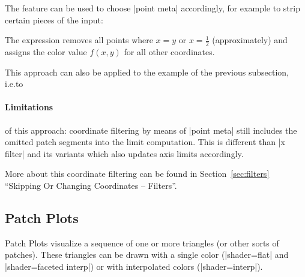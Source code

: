 {The feature can be used to choose |point meta| accordingly, for example to
strip certain pieces of the input:
%
\begin{codeexample}[]
\end{codeexample}

The expression removes all points where $x=y$ or $x=\frac12$ (approximately)
and assigns the color value $f(x,y)$ for all other coordinates.

This approach can also be applied to the example of the previous subsection,
i.e.\@ to
%
\begin{codeexample}[]
\end{codeexample}


\paragraph{Limitations}

of this approach: coordinate filtering by means of |point meta| still includes
the omitted patch segments into the limit computation. This is different than
|x filter| and its variants which also updates axis limits accordingly.

More about this coordinate filtering can be found in Section~\ref{sec:filters}
``Skipping Or Changing Coordinates -- Filters''.


\subsection{Patch Plots}
\label{sec:pgfplots:2d:patch}

Patch Plots visualize a sequence of one or more triangles (or other sorts of
patches). These triangles can be drawn with a single color (|shader=flat| and
|shader=faceted interp|) or with interpolated colors (|shader=interp|).

}
